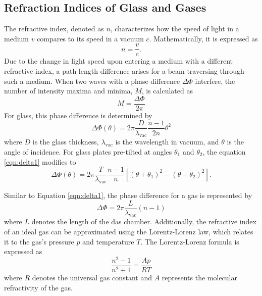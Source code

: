 \subsection{Refraction Indices of Glass and Gases}
The refractive index, denoted as $n$, characterizes how the speed of light in a medium $v$ 
compares to its speed in a vacuum $c$. Mathematically, it is expressed as
\begin{equation*}
    n=\frac{v}{c}.
\end{equation*}
Due to the change in light speed upon entering a medium with a different refractive index, 
a path length difference arises for a beam traversing through such a medium. 
When two waves with a phase difference $\Delta\Phi$ interfere, the number of intensity 
maxima and minima, $M$, is calculated as
\begin{equation}
    M=\frac{\Delta\Phi}{2\pi}
    \label{eqn:M}
\end{equation}
For glass, this phase difference is determined by
\begin{equation}
    \Delta\Phi(\theta)=2\pi\frac{D}{\lambda_\text{vac}}\frac{n-1}{2n}\theta^2
    \label{eqn:delta1}
\end{equation}
where $D$ is the glass thickness, $\lambda_\text{vac}$ is the wavelength in vacuum, and $\theta$ 
is the angle of incidence. For glass plates pre-tilted at angles $\theta_1$ and $\theta_2$, 
the equation \eqref{eqn:delta1} modifies to
\begin{equation}
    \Delta\Phi(\theta)=2\pi\frac{T}{\lambda_\text{vac}}\frac{n-1}{n}[(\theta+\theta_1)^2-(\theta+\theta_2)^2].
    \label{eqn:delta}
\end{equation}

Similar to Equation \eqref{eqn:delta1}, the phase difference for a gas is represented by
\begin{equation*}
    \Delta\Phi=2\pi\frac{L}{\lambda_\text{vac}}(n-1)
\end{equation*}
where $L$ denotes the length of the das chamber.
Additionally, the refractive index of an ideal gas can be approximated using the Lorentz-Lorenz law, 
which relates it to the gas's pressure $p$ and temperature $T$. The Lorentz-Lorenz formula is expressed as
\begin{equation}
    \frac{n^2-1}{n^2+1}=\frac{Ap}{RT}
    \label{eqn:LLL}
\end{equation}
where $R$ denotes the universal gas constant and $A$ represents the molecular refractivity of the gas.
